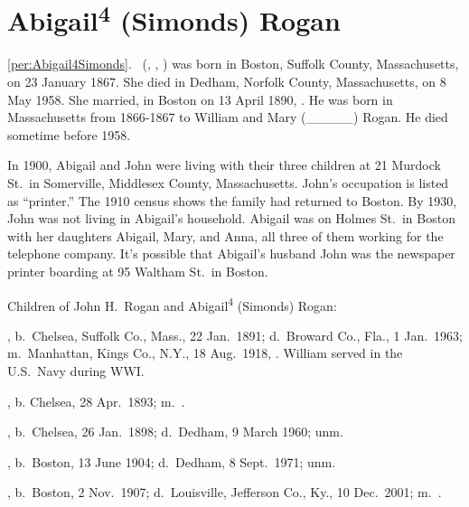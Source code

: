 \section{Abigail\textsuperscript{4} (Simonds) Rogan}

\ref{per:Abigail4Simonds}.\  (, , ) was born in Boston, Suffolk County, Massachusetts, on 23 January 1867.\cite{Abigail4SimondsBirth} She died in Dedham, Norfolk County, Massachusetts, on 8 May 1958.\cite{Abigail4SimondsDeath} She married, in Boston on 13 April 1890, . He was born in Massachusetts from 1866-1867 to William and Mary (\_\_\_\_\_) Rogan.\cite{Census1880JohnRogan} He died sometime before 1958.\cite{Abigail4SimondsDeath}

In 1900, Abigail and John were living with their three children at 21 Murdock St.\ in Somerville, Middlesex County, Massachusetts. John's occupation is listed as ``printer.''\cite{Census1900AbigailSimonds} The 1910 census shows the family had returned to Boston.\cite{Census1910AbigailSimonds} By 1930, John was not living in Abigail's household. Abigail was on Holmes St.\ in Boston with her daughters Abigail, Mary, and Anna, all three of them working for the telephone company.\cite{Census1930AbigailSimonds} It's possible that Abigail's husband John was the newspaper printer boarding at 95 Waltham St.\ in Boston.\cite{Census1930JohnRogan}

\begin{KidsIntro}
	Children of John H.\ Rogan and Abigail\textsuperscript{4} (Simonds) Rogan:
\end{KidsIntro}

\begin{Kids}
	, b.\ Chelsea, Suffolk Co., Mass., 22 Jan.\ 1891;\cite{William5RoganBirth} d.\ Broward Co., Fla., 1 Jan.\ 1963;\cite{William5RoganDeath,William5RoganHeadstone} m.\ Manhattan, Kings Co., N.Y., 18 Aug.\ 1918, .\cite{William5RoganMarriage} William served in the U.S.\ Navy during WWI.\cite{William5RoganHeadstone}
	
	, b. Chelsea, 28 Apr.\ 1893;\cite{Marguerite5RoganBirth} m.\ .\cite{Census1940Marguerite5Rogan}
	
	, b.\ Chelsea, 26 Jan.\ 1898;\cite{Abigail5RoganBirth} d.\ Dedham, 9 March 1960; unm.\cite{Abigail5RoganDeath}
	
	, b.\ Boston, 13 June 1904;\cite{Mary5RoganBirth} d.\ Dedham, 8 Sept.\ 1971; unm.\cite{Mary5RoganDeath}
	
	, b.\ Boston, 2 Nov.\ 1907;\cite{Anne5RoganBirth} d.\ Louisville, Jefferson Co., Ky., 10 Dec.\ 2001;\cite{Anne5RoganDeath} m.\ .\cite{Census1940Anne5Rogan}
\end{Kids}